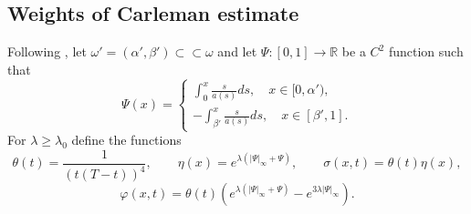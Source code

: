 \documentclass[11pt,oneside,a4papper]{osajnl}
\newtheorem{teo}{Theorem}
\newcommand{\R}{\mathbb{R}}
\begin{document}

   
\subsection{Weights of Carleman estimate}

Following \cite{DemarqueLimacoViana_deg_eq2018, DemarqueLimacoViana_deg_sys2020}, let $\omega'=(\alpha',\beta') \subset\subset \omega$ and let $\Psi : [0,1] \to \R$ be a $C^2$ function such that
$$
\Psi(x) = 
\begin{cases}
\int_0^x \frac{s}{a(s)} ds, \quad x \in [0,\alpha'), \\
-\int_{\beta'}^x \frac{s}{a(s)} ds, \quad x \in [\beta',1].
\end{cases}
$$
For $\lambda \geq \lambda_0$ define the functions
$$
\theta(t) = \frac{1}{(t(T-t))^4}, \qquad \eta(x) = e^{\lambda(|\Psi|_\infty + \Psi)}, \qquad \sigma(x,t) = \theta(t) \eta(x),
$$
$$
\varphi(x,t) = \theta(t) (e^{\lambda(|\Psi|_\infty + \Psi)}-e^{3\lambda|\Psi|_\infty}).
$$
\end{document}
